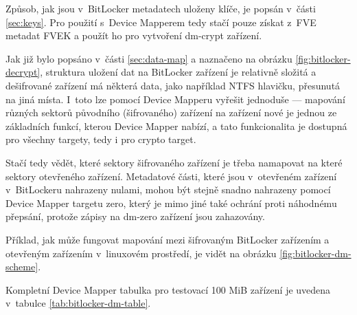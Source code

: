 Způsob, jak jsou v~BitLocker metadatech uloženy klíče, je popsán v~části \ref{sec:keys}. Pro použití s~Device Mapperem tedy stačí pouze získat z~FVE metadat FVEK a použít ho pro vytvoření dm-crypt zařízení.


Jak již bylo popsáno v~části \ref{sec:data-map} a naznačeno na obrázku \ref{fig:bitlocker-decrypt}, struktura uložení dat na BitLocker zařízení je relativně složitá a dešifrované zařízení má některá data, jako například NTFS hlavičku, přesunutá na jiná místa. I~toto lze pomocí Device Mapperu vyřešit jednoduše --- mapování různých sektorů původního (šifrovaného) zařízení na zařízení nové je jednou ze základních funkcí, kterou Device Mapper nabízí, a tato funkcionalita je dostupná pro všechny targety, tedy i pro crypto target.

Stačí tedy vědět, které sektory šifrovaného zařízení je třeba namapovat na které sektory otevřeného zařízení. Metadatové části, které jsou v~otevřeném zařízení v~BitLockeru nahrazeny nulami, mohou být stejně snadno nahrazeny pomocí Device Mapper targetu zero, který je mimo jiné také ochrání proti náhodnému přepsání, protože zápisy na dm-zero zařízení jsou zahazovány\cite{KernelZero}.

Příklad, jak může fungovat mapování mezi šifrovaným BitLocker zařízením a otev\-ře\-ným zařízením v~linuxovém prostředí, je vidět na obrázku \ref{fig:bitlocker-dm-scheme}.

Kompletní Device Mapper tabulka pro testovací 100 MiB zařízení je uvedena v~ta\-bul\-ce \ref{tab:bitlocker-dm-table}.


